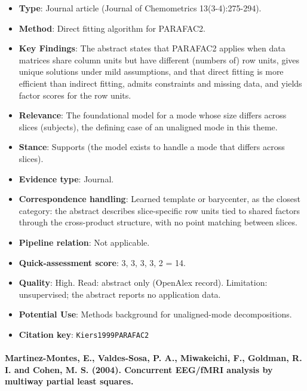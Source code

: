 \documentclass[journal,onecolumn]{IEEEtran}
\begin{document}
\begin{itemize}

\item{} \textbf{Type}: Journal article (Journal of Chemometrics 13(3-4):275-294).

\item{} \textbf{Method}: Direct fitting algorithm for PARAFAC2.

\item{} \textbf{Key Findings}: The abstract states that PARAFAC2 applies when data matrices share column units but have different (numbers of) row units, gives unique solutions under mild assumptions, and that direct fitting is more efficient than indirect fitting, admits constraints and missing data, and yields factor scores for the row units.

\item{} \textbf{Relevance}: The foundational model for a mode whose size differs across slices (subjects), the defining case of an unaligned mode in this theme.

\item{} \textbf{Stance}: Supports (the model exists to handle a mode that differs across slices).

\item{} \textbf{Evidence type}: Journal.

\item{} \textbf{Correspondence handling}: Learned template or barycenter, as the closest category: the abstract describes slice-specific row units tied to shared factors through the cross-product structure, with no point matching between slices.

\item{} \textbf{Pipeline relation}: Not applicable.

\item{} \textbf{Quick-assessment score}: 3, 3, 3, 3, 2 = 14.

\item{} \textbf{Quality}: High. Read: abstract only (OpenAlex record). Limitation: unsupervised; the abstract reports no application data.

\item{} \textbf{Potential Use}: Methods background for unaligned-mode decompositions.

\item{} \textbf{Citation key}: \texttt{Kiers1999PARAFAC2}

\end{itemize}

\paragraph{Martinez-Montes, E., Valdes-Sosa, P. A., Miwakeichi, F., Goldman, R. I. and Cohen, M. S. (2004). Concurrent EEG/fMRI analysis by multiway partial least squares.~\cite{MartinezMontes2004Concurrent}}\mbox{}
\end{document}
